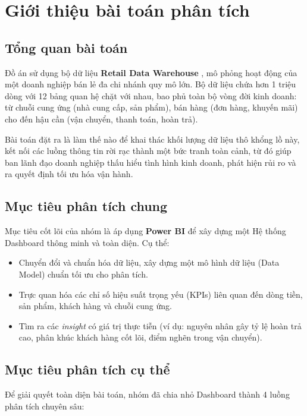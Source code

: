 \section{Giới thiệu bài toán phân tích}

\subsection{Tổng quan bài toán}
Đồ án sử dụng bộ dữ liệu \textbf{Retail Data Warehouse} \cite{kaggle_retail}, mô phỏng hoạt động của một doanh nghiệp bán lẻ đa chi nhánh quy mô lớn. Bộ dữ liệu chứa hơn 1 triệu dòng với 12 bảng quan hệ chặt với nhau, bao phủ toàn bộ vòng đời kinh doanh: từ chuỗi cung ứng (nhà cung cấp, sản phẩm), bán hàng (đơn hàng, khuyến mãi) cho đến hậu cần (vận chuyển, thanh toán, hoàn trả). 

Bài toán đặt ra là làm thế nào để khai thác khối lượng dữ liệu thô khổng lồ này, kết nối các luồng thông tin rời rạc thành một bức tranh toàn cảnh, từ đó giúp ban lãnh đạo doanh nghiệp thấu hiểu tình hình kinh doanh, phát hiện rủi ro và ra quyết định tối ưu hóa vận hành.

\subsection{Mục tiêu phân tích chung}
Mục tiêu cốt lõi của nhóm là áp dụng \textbf{Power BI} để xây dựng một Hệ thống Dashboard thông minh và toàn diện. Cụ thể:
\begin{itemize}
    \item Chuyển đổi và chuẩn hóa dữ liệu, xây dựng một mô hình dữ liệu (Data Model) chuẩn tối ưu cho phân tích.
    \item Trực quan hóa các chỉ số hiệu suất trọng yếu (KPIs) liên quan đến dòng tiền, sản phẩm, khách hàng và chuỗi cung ứng.
    \item Tìm ra các \textit{insight} có giá trị thực tiễn (ví dụ: nguyên nhân gây tỷ lệ hoàn trả cao, phân khúc khách hàng cốt lõi, điểm nghẽn trong vận chuyển).
\end{itemize}

\subsection{Mục tiêu phân tích cụ thể}
Để giải quyết toàn diện bài toán, nhóm đã chia nhỏ Dashboard thành 4 luồng phân tích chuyên sâu:

